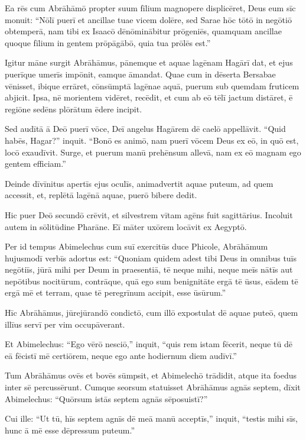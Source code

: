 \Versus Ea rēs cum Abrāhāmō propter suum fīlium magnopere displicēret,
\Versus Deus eum sīc monuit: ``Nōlī puerī et ancillae tuae vicem dolēre, sed Sarae hōc tōtō in negōtiō obtemperā, nam tibi ex Isaacō dēnōminābitur prōgeniēs,
\Versus quamquam ancillae quoque fīlium in gentem prōpāgābō, quia tua prōlēs est.''

\Versus Igitur māne surgit Abrāhāmus, pānemque et aquae lagēnam Hagārī dat, et ejus puerīque umerīs impōnit, eamque āmandat. Quae cum in dēserta Bersabae vēnisset, ibique errāret,
\Versus cōnsūmptā lagēnae aquā, puerum sub quemdam fruticem abjicit.
\Versus Ipsa, nē morientem vidēret, recēdit, et cum ab eō tēlī jactum distāret, ē regiōne sedēns plōrātum ēdere incipit.

\Versus Sed audītā ā Deō puerī vōce, Deī angelus Hagārem dē caelō appellāvit. ``Quid habēs, Hagar?'' inquit. ``Bonō es animō, nam puerī vōcem Deus ex eō, in quō est, locō exaudīvit.
\Versus Surge, et puerum manū prehēnsum allevā, nam ex eō magnam ego gentem efficiam.''

\Versus Deinde dīvīnitus apertīs ejus oculīs, animadvertit aquae puteum, ad quem accessit, et, replētā lagēnā aquae, puerō bibere dedit.

\Versus Hic puer Deō secundō crēvit, et silvestrem vītam agēns fuit sagittārius.
\Versus Incoluit autem in sōlitūdine Pharāne. Eī māter uxōrem locāvit ex Aegyptō.

\Versus Per id tempus Abimelechus cum suī exercitūs duce Phicole, Abrāhāmum hujusmodī verbīs adortus est: ``Quoniam quidem adest tibi Deus in omnibus tuīs negōtiīs,
\Versus jūrā mihi per Deum in praesentiā, tē neque mihi, neque meīs nātīs aut nepōtibus nocitūrum, contrāque, quā ego sum benignitāte ergā tē ūsus, eādem tē ergā mē et terram, quae tē peregrīnum accipit, esse ūsūrum.''

\Versus Hīc Abrāhāmus, jūrejūrandō condictō,
\Versus cum illō expostulat dē aquae puteō, quem illīus servī per vim occupāverant.

\Versus Et Abimelechus: ``Ego vērō nesciō,'' inquit, ``quis rem istam fēcerit, neque tū dē eā fēcistī mē certiōrem, neque ego ante hodiernum diem audīvī.''

\Versus Tum Abrāhāmus ovēs et bovēs sūmpsit, et Abimelechō trādidit, atque ita foedus inter sē percussērunt.
\Versus Cumque seorsum statuisset Abrāhāmus agnās septem,
\Versus dīxit Abimelechus: ``Quōrsum istās septem agnās sēposuistī?''

\Versus Cui ille: ``Ut tū, hīs septem agnīs dē meā manū acceptīs,'' inquit, ``testis mihi sīs, hunc ā mē esse dēpressum puteum.''

